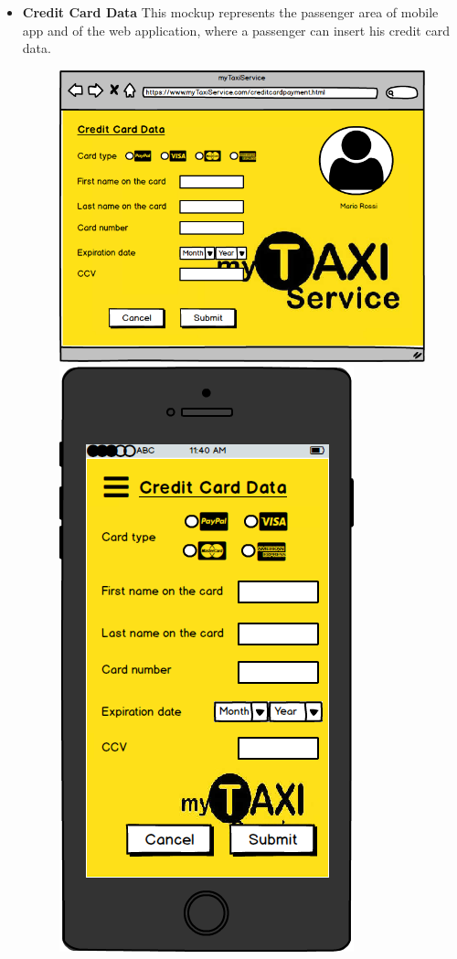 \documentclass[18pt,oneside,a4paper, titlepage]{article}
\begin{document}
\begin{itemize}
\begin{figure}[h]
				\end{figure}
				\\ \\ \\ 
				\item \textbf{Credit Card Data} This mockup represents the passenger area of mobile app and of the web application, where a passenger can insert his credit card data.\\
				\begin{figure}[h]
					\includegraphics[scale=0.3]{WebAppCreditCardData.png}%
					\qquad\qquad
					\includegraphics[scale=0.3]{MobileAppCreditCardData.png}

\end{figure}
\end{itemize}
\end{document}
